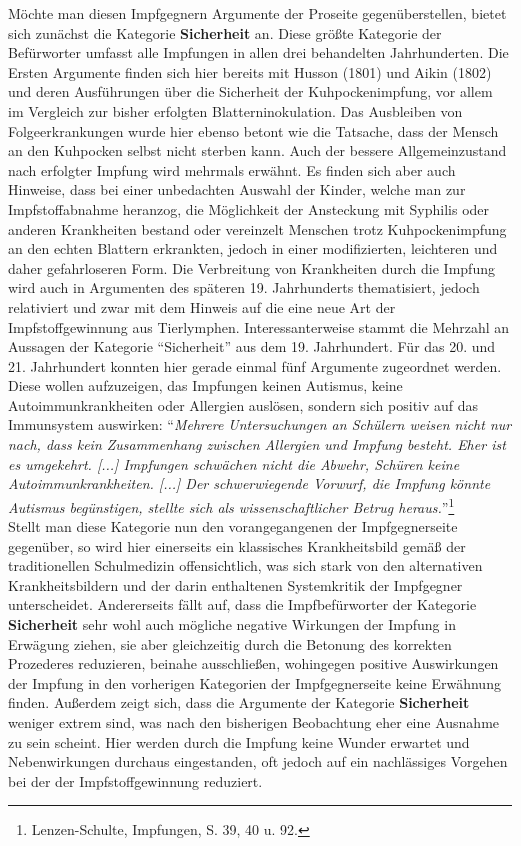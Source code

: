 \documentclass[
    a4paper,
    12pt,
    hyphens,
    chapterprefix=true,
    headheight=33pt,
    footheight=29pt,
    headings=optiontohead,
]{scrartcl}
\begin{document}
{Möchte man diesen Impfgegnern Argumente der Proseite gegenüberstellen, bietet sich zunächst die Kategorie \textbf{Sicherheit} an. Diese größte Kategorie der Befürworter umfasst alle Impfungen in allen drei behandelten Jahrhunderten. Die Ersten Argumente finden sich hier bereits mit Husson (1801) und Aikin (1802) und deren Ausführungen über die Sicherheit der Kuhpockenimpfung, vor allem im Vergleich zur bisher erfolgten Blatterninokulation. Das Ausbleiben von Folgeerkrankungen wurde hier ebenso betont wie die Tatsache, dass der Mensch an den Kuhpocken selbst nicht sterben kann. Auch der bessere Allgemeinzustand nach erfolgter Impfung wird mehrmals erwähnt. Es finden sich aber auch Hinweise, dass bei einer unbedachten Auswahl der Kinder, welche man zur Impfstoffabnahme heranzog, die Möglichkeit der Ansteckung mit Syphilis oder anderen Krankheiten bestand oder vereinzelt Menschen trotz Kuhpockenimpfung an den echten Blattern erkrankten, jedoch in einer modifizierten, leichteren und daher gefahrloseren Form. Die Verbreitung von Krankheiten durch die Impfung wird auch in Argumenten des späteren 19. Jahrhunderts thematisiert, jedoch relativiert und zwar mit dem Hinweis auf die eine neue Art der Impfstoffgewinnung aus Tierlymphen. Interessanterweise stammt die Mehrzahl an Aussagen der Kategorie "`Sicherheit"' aus dem 19. Jahrhundert. Für das 20. und 21. Jahrhundert konnten hier gerade einmal fünf Argumente zugeordnet werden. Diese wollen aufzuzeigen, das Impfungen keinen Autismus, keine Autoimmunkrankheiten oder Allergien auslösen, sondern sich positiv auf das Immunsystem auswirken: "`\textit{Mehrere Untersuchungen an Schülern weisen nicht nur nach, dass kein Zusammenhang zwischen Allergien und Impfung besteht. Eher ist es umgekehrt. [...] Impfungen schwächen nicht die Abwehr, Schüren keine Autoimmunkrankheiten. [...] Der schwerwiegende Vorwurf, die Impfung könnte Autismus begünstigen, stellte sich als wissenschaftlicher Betrug heraus.}"'\footnote{Lenzen-Schulte, Impfungen, S. 39, 40 u. 92.}
\\
Stellt man diese Kategorie nun den vorangegangenen der Impfgegnerseite gegenüber, so wird hier einerseits ein klassisches Krankheitsbild gemäß der traditionellen Schulmedizin offensichtlich, was sich stark von den alternativen Krankheitsbildern und der darin enthaltenen Systemkritik der Impfgegner unterscheidet. Andererseits fällt auf, dass die Impfbefürworter der Kategorie \textbf{Sicherheit} sehr wohl auch mögliche negative Wirkungen der Impfung in Erwägung ziehen, sie aber gleichzeitig durch die Betonung des korrekten Prozederes reduzieren, beinahe ausschließen, wohingegen positive Auswirkungen der Impfung in den vorherigen Kategorien der Impfgegnerseite keine Erwähnung finden. Außerdem zeigt sich, dass die Argumente der Kategorie \textbf{Sicherheit} weniger extrem sind, was nach den bisherigen Beobachtung eher eine Ausnahme zu sein scheint. Hier werden durch die Impfung keine Wunder erwartet und Nebenwirkungen durchaus eingestanden, oft jedoch auf ein nachlässiges Vorgehen bei der der Impfstoffgewinnung reduziert.\\
}
\end{document}
